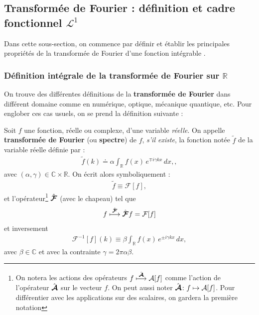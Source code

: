 \smallskip


\subsection{Transformée de Fourier : définition et cadre fonctionnel $\mathcal L^1$}

Dans cette sous-section, on commence par définir et établir les principales propriétés de la transformée de Fourier d'une fonction intégrable \cite{AppelMathPhysiciens, GerardNotesFourier, BabadjianChap5, DeMarcayFourier, HareMQ, GourdonAnalyse, GourdonAlgebre}.

\smallskip  

\subsubsection{Définition intégrale de la transformée de Fourier sur $\mathbb R$}

On trouve des différentes définitions de la {\bf transformée de Fourier} dans différent domaine comme en numérique, optique,  mécanique quantique, etc. Pour englober ces cas usuels, on se prend la définition suivante :
\begin{Defi} Soit $f$ une fonction, réelle ou complexe, d'une variable {\em réelle}. On appelle {\bf transformée de Fourier} (ou {\bf spectre}) de $f$, {\em s'il existe}, la fonction notée $\tilde f$ de la variable réelle définie par :
    \begin{eqnarray}
        \tilde{f}(k) \doteq \alpha \int_{\mathbb{R}} f(x)\, e^{\mp i \gamma k x}\, dx, \label{eq:fourier_def}, 
    \end{eqnarray}
    avec $(\alpha , \gamma ) \in \mathbb{C} \times \mathbb{R}$. On écrit alors symboliquement :
    \begin{eqnarray}
        \tilde{f} \equiv \mathcal F [f], 
    \end{eqnarray} 
    et l'opérateur\footnote{On notera les actions des opérateurs $f \overset{\hat{\bm{\mathcal{A}}}}{\longmapsto} \mathcal A[f]$ comme l'action de l'opérateur $\hat{\bm{\mathcal{A}}}$ sur le vecteur $f$. On peut aussi noter $\hat{\bm{\mathcal A}} \colon f \mapsto \mathcal A[f]$. Pour différentier avec les applications sur des scalaires, on gardera la première notation} $\hat{\bm{\mathcal{F}}} $ (avec le chapeau)  tel que 
    \begin{eqnarray}
        f \overset{\hat{\bm{\mathcal F}}}{\longmapsto} \hat{\bm{\mathcal{F}}} f =  \mathcal F[f]
    \end{eqnarray}
    et inversement
    \begin{eqnarray}
        \mathcal{F}^{-1}[f](k) \equiv \beta \int_{\mathbb{R}} f(x)\, e^{\pm i \gamma k x}\, dx,
    \end{eqnarray}
    avec $\beta \in \mathbb{C}$ et avec la contrainte $ \gamma = 2 \pi \alpha \beta $.
\end{Defi} 

